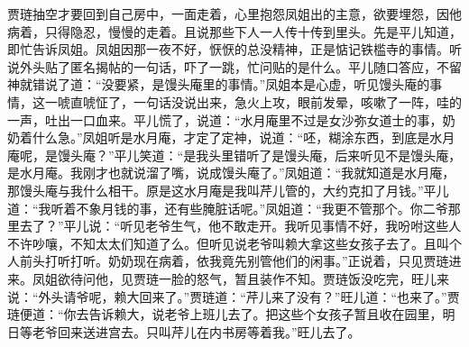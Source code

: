 \begin{parag}
    贾琏抽空才要回到自己房中，一面走着，心里抱怨凤姐出的主意，欲要埋怨，因他病着，只得隐忍，慢慢的走着。且说那些下人一人传十传到里头。先是平儿知道，即忙告诉凤姐。凤姐因那一夜不好，恹恹的总没精神，正是惦记铁槛寺的事情。听说外头贴了匿名揭帖的一句话，吓了一跳，忙问贴的是什么。平儿随口答应，不留神就错说了道：“没要紧，是馒头庵里的事情。”凤姐本是心虚，听见馒头庵的事情，这一唬直唬怔了，一句话没说出来，急火上攻，眼前发晕，咳嗽了一阵，哇的一声，吐出一口血来。平儿慌了，说道：“水月庵里不过是女沙弥女道士的事，奶奶着什么急。”凤姐听是水月庵，才定了定神，说道：“呸，糊涂东西，到底是水月庵呢，是馒头庵？”平儿笑道：“是我头里错听了是馒头庵，后来听见不是馒头庵，是水月庵。我刚才也就说溜了嘴，说成馒头庵了。”凤姐道：“我就知道是水月庵，那馒头庵与我什么相干。原是这水月庵是我叫芹儿管的，大约克扣了月钱。”平儿道：“我听着不象月钱的事，还有些腌脏话呢。”凤姐道：“我更不管那个。你二爷那里去了？”平儿说：“听见老爷生气，他不敢走开。我听见事情不好，我吩咐这些人不许吵嚷，不知太太们知道了么。但听见说老爷叫赖大拿这些女孩子去了。且叫个人前头打听打听。奶奶现在病着，依我竟先别管他们的闲事。”正说着，只见贾琏进来。凤姐欲待问他，见贾琏一脸的怒气，暂且装作不知。贾琏饭没吃完，旺儿来说：“外头请爷呢，赖大回来了。”贾琏道：“芹儿来了没有？”旺儿道：“也来了。”贾琏便道：“你去告诉赖大，说老爷上班儿去了。把这些个女孩子暂且收在园里，明日等老爷回来送进宫去。只叫芹儿在内书房等着我。”旺儿去了。
\end{parag}


